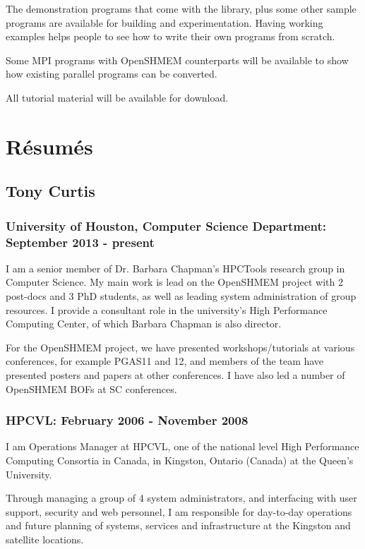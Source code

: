 \documentclass[10pt,english]{article}
\begin{document}
The demonstration programs that come with the library, plus some other
sample programs are available for building and experimentation.
Having working examples helps people to see how to write their own
programs from scratch.

Some MPI programs with OpenSHMEM counterparts will be available to
show how existing parallel programs can be converted.

All tutorial material will be available for download.

\section{R\'{e}sum\'{e}s}

\subsection{Tony Curtis}

\subsubsection*{University of Houston, Computer Science Department:
  September 2013 - present}

    I am a senior member of Dr. Barbara Chapman's HPCTools research
    group in Computer Science.  My main work is lead on the OpenSHMEM
    project with 2 post-docs and 3 PhD students, as well as leading
    system administration of group resources.  I provide a consultant
    role in the university's High Performance Computing Center, of
    which Barbara Chapman is also director.

    For the OpenSHMEM project, we have presented workshops/tutorials
    at various conferences, for example PGAS11 and 12, and members of
    the team have presented posters and papers at other conferences.
    I have also led a number of OpenSHMEM BOFs at SC conferences.

\subsubsection*{HPCVL:
  February 2006 - November 2008}

    I am Operations Manager at HPCVL, one of the national level High
    Performance Computing Consortia in Canada, in Kingston, Ontario
    (Canada) at the Queen's University.

    Through managing a group of 4 system administrators, and
    interfacing with user support, security and web personnel, I am
    responsible for day-to-day operations and future planning of
    systems, services and infrastructure at the Kingston and satellite
    locations.
\end{document}
